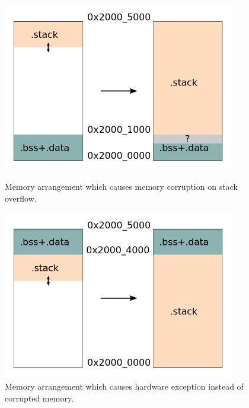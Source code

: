 \begin{figure}[H]
    \begin{minipage}[t]{0.45\textwidth}
        \centering
        \includegraphics[width=0.9\textwidth]{obrazky/flip_overflow}
        \caption{Memory arrangement which causes memory corruption on stack overflow\cite{knurling_project_knurling-rsflip-link_2021}.}
        \label{fig:fliplink_orig}
    \end{minipage}\hfill
    \begin{minipage}[t]{0.45\textwidth}
        \centering
        \includegraphics[width=0.9\textwidth]{obrazky/flip_flipped}
        \caption{Memory arrangement which causes hardware exception instead of corrupted memory\cite{knurling_project_knurling-rsflip-link_2021}.}
        \label{fig:fliplink_changed}
    \end{minipage}
\end{figure}

